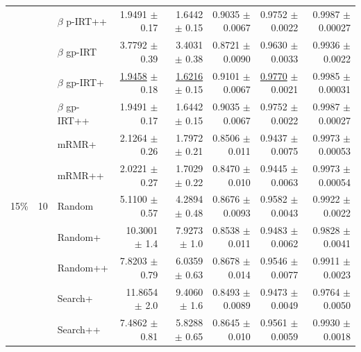 \begin{longtable}{llp{}rrrrr}
 &  & $\beta$ p-IRT++ & 1.9491 {\scriptsize $\pm$ 0.17} & 1.6442 {\scriptsize $\pm$ 0.15} & 0.9035 {\scriptsize $\pm$ 0.0067} & 0.9752 {\scriptsize $\pm$ 0.0022} & 0.9987 {\scriptsize $\pm$ 0.00027} \\
 &  & $\beta$ gp-IRT & 3.7792 {\scriptsize $\pm$ 0.39} & 3.4031 {\scriptsize $\pm$ 0.38} & 0.8721 {\scriptsize $\pm$ 0.0090} & 0.9630 {\scriptsize $\pm$ 0.0033} & 0.9936 {\scriptsize $\pm$ 0.0022} \\
 &  & $\beta$ gp-IRT+ & \underline{1.9458} {\scriptsize $\pm$ 0.18} & \underline{1.6216} {\scriptsize $\pm$ 0.15} & 0.9101 {\scriptsize $\pm$ 0.0067} & \underline{0.9770} {\scriptsize $\pm$ 0.0021} & 0.9985 {\scriptsize $\pm$ 0.00031} \\
 &  & $\beta$ gp-IRT++ & 1.9491 {\scriptsize $\pm$ 0.17} & 1.6442 {\scriptsize $\pm$ 0.15} & 0.9035 {\scriptsize $\pm$ 0.0067} & 0.9752 {\scriptsize $\pm$ 0.0022} & 0.9987 {\scriptsize $\pm$ 0.00027} \\
 &  & mRMR+ & 2.1264 {\scriptsize $\pm$ 0.26} & 1.7972 {\scriptsize $\pm$ 0.21} & 0.8506 {\scriptsize $\pm$ 0.011} & 0.9437 {\scriptsize $\pm$ 0.0075} & 0.9973 {\scriptsize $\pm$ 0.00053} \\
 &  & mRMR++ & 2.0221 {\scriptsize $\pm$ 0.27} & 1.7029 {\scriptsize $\pm$ 0.22} & 0.8470 {\scriptsize $\pm$ 0.010} & 0.9445 {\scriptsize $\pm$ 0.0063} & 0.9973 {\scriptsize $\pm$ 0.00054} \\
\midrule
15\% & 10 & Random & 5.1100 {\scriptsize $\pm$ 0.57} & 4.2894 {\scriptsize $\pm$ 0.48} & 0.8676 {\scriptsize $\pm$ 0.0093} & 0.9582 {\scriptsize $\pm$ 0.0043} & 0.9922 {\scriptsize $\pm$ 0.0022} \\
 &  & Random+ & 10.3001 {\scriptsize $\pm$ 1.4} & 7.9273 {\scriptsize $\pm$ 1.0} & 0.8538 {\scriptsize $\pm$ 0.011} & 0.9483 {\scriptsize $\pm$ 0.0062} & 0.9828 {\scriptsize $\pm$ 0.0041} \\
 &  & Random++ & 7.8203 {\scriptsize $\pm$ 0.79} & 6.0359 {\scriptsize $\pm$ 0.63} & 0.8678 {\scriptsize $\pm$ 0.014} & 0.9546 {\scriptsize $\pm$ 0.0077} & 0.9911 {\scriptsize $\pm$ 0.0023} \\
 &  & Search+ & 11.8654 {\scriptsize $\pm$ 2.0} & 9.4060 {\scriptsize $\pm$ 1.6} & 0.8493 {\scriptsize $\pm$ 0.0089} & 0.9473 {\scriptsize $\pm$ 0.0049} & 0.9764 {\scriptsize $\pm$ 0.0050} \\
 &  & Search++ & 7.4862 {\scriptsize $\pm$ 0.81} & 5.8288 {\scriptsize $\pm$ 0.65} & 0.8645 {\scriptsize $\pm$ 0.010} & 0.9561 {\scriptsize $\pm$ 0.0059} & 0.9930 {\scriptsize $\pm$ 0.0018} \\

\end{longtable}
